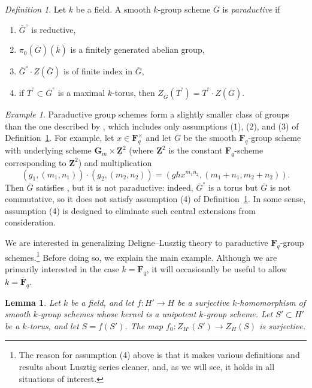 \documentclass[reqno]{amsart}
\numberwithin{equation}{subsection}
\newcommand{\F}{\mathbf{F}}
\newcommand{\G}{\mathbf{G}}
\newcommand{\Z}{\mathbf{Z}}
\newcommand{\ol}[1]{\overline{#1}}
\newcommand{\co}{\colon}
\newtheorem{lemma}[thm]{Lemma}
\theoremstyle{remark}
\newtheorem{defn}[thm]{Definition}
\newtheorem{example}[thm]{Example}
\numberwithin{equation}{subsection}
\numberwithin{figure}{subsection}
\begin{document}
\begin{defn}\label{def:paraductive}
    Let $k$ be a field. A smooth $k$-group scheme $\ol G$ is \textit{paraductive} if
    \begin{enumerate}
        \item $\ol G^\circ$ is reductive,
        \item $\pi_0(\ol G)(\ol k)$ is a finitely generated abelian group,
        \item $\ol G^\circ \cdot Z(\ol G)$ is of finite index in $\ol G$,
        \item if $\ol T^\circ \subset \ol G^\circ$ is a maximal $k$-torus, then $Z_{\ol G}(\ol T^\circ) = \ol T^\circ \cdot Z(\ol G)$.
    \end{enumerate}
\end{defn}

\begin{example}
    Paraductive group schemes form a slightly smaller class of groups than the one described by \cite[Assumption 2.1.1]{Kal21b}, which includes only assumptions (1), (2), and (3) of Definition~\ref{def:paraductive}. For example, let $x \in \F_q^\times$ and let $\ol G$ be the smooth $\F_q$-group scheme with underlying scheme $\G_m \times \underline{\Z}^2$ (where $\underline{\Z}^2$ is the constant $\F_q$-scheme corresponding to $\Z^2$) and multiplication
    \[
    (g_1, (m_1, n_1)) \cdot (g_2, (m_2, n_2)) = (ghx^{m_1n_2}, (m_1 + n_1, m_2 + n_2)).
    \]
    Then $\ol G$ satisfies \cite[Assumption 2.1.1]{Kal21b}, but it is not paraductive: indeed, $\ol G^\circ$ is a torus but $\ol G$ is not commutative, so it does not satisfy assumption (4) of Definition~\ref{def:paraductive}. In some sense, assumption (4) is designed to eliminate such central extensions from consideration.
\end{example}

We are interested in generalizing Deligne--Lusztig theory to paraductive $\F_q$-group schemes.\footnote{The reason for assumption (4) above is that it makes various definitions and results about Lusztig series cleaner, and, as we will see, it holds in all situations of interest.} Before doing so, we explain the main example. Although we are primarily interested in the case $k = \F_q$, it will occasionally be useful to allow $k = \ol\F_q$.

\begin{lemma}\label{lemma:surj-centralizers}
    Let $k$ be a field, and let $f\co H' \to H$ be a surjective $k$-homomorphism of smooth $k$-group schemes whose kernel is a unipotent $k$-group scheme. Let $S' \subset H'$ be a $k$-torus, and let $S = f(S')$. The map $f_0\co Z_{H'}(S') \to Z_H(S)$ is surjective.
\end{lemma}
\end{document}
